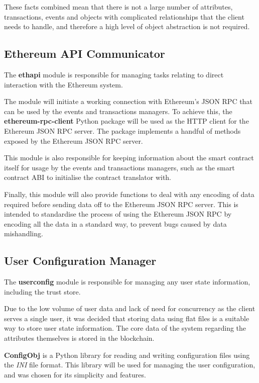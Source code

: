 \documentclass[12pt]{report}
\begin{document}
	These facts combined mean that there is not a large number of attributes, transactions, events and objects with complicated relationships that the client needs to handle, and therefore a high level of object abstraction is not required.
	
	\subsection{Ethereum API Communicator}
	The \textbf{ethapi} module is responsible for managing tasks relating to direct interaction with the Ethereum system.
	
	The module will initiate a working connection with Ethereum's JSON RPC that can be used by the events and transactions managers. To achieve this, the \textbf{ethereum-rpc-client} Python package will be used as the HTTP client for the Ethereum JSON RPC server. The package implements a handful of methods exposed by the Ethereum JSON RPC server.\cite{18}
	
	This module is also responsible for keeping information about the smart contract itself for usage by the events and transactions managers, such as the smart contract ABI to initialise the contract translator with.
	
	Finally, this module will also provide functions to deal with any encoding of data required before sending data off to the Ethereum JSON RPC server. This is intended to standardise the process of using the Ethereum JSON RPC by encoding all the data in a standard way, to prevent bugs caused by data mishandling.
	
	\subsection{User Configuration Manager}
	The \textbf{userconfig} module is responsible for managing any user state information, including the trust store.
	
	Due to the low volume of user data and lack of need for concurrency as the client serves a single user, it was decided that storing data using flat files is a suitable way to store user state information. The core data of the system regarding the attributes themselves is stored in the blockchain.
	
	\textbf{ConfigObj} is a Python library for reading and writing configuration files using the \textit{INI} file format. This library will be used for managing the user configuration, and was chosen for its simplicity and features.
	
\end{document}
